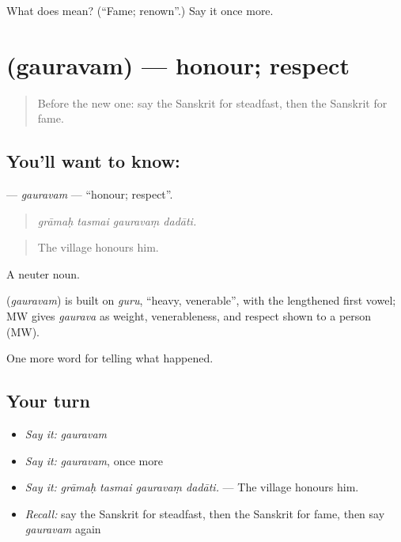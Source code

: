 \begin{tcolorbox}[breakable,colback=teal!4,colframe=teal!35!black,title={Before you move on}]
What does  mean? (\textquotedblleft{}Fame; renown\textquotedblright{}.) Say it once more.
\end{tcolorbox}
\section[\texorpdfstring{\sk{गौरवम्} (gauravam)}{गौरवम् (gauravam)}]{ (gauravam) — honour; respect}

\label{lesson:SA-C314-gauravam}



\begin{quote}
Before the new one: say the Sanskrit for steadfast, then the Sanskrit for fame.
\end{quote}

\subsection*{You'll want to know: }
\textbf{} — \emph{gauravam} — \textquotedblleft{}honour; respect\textquotedblright{}.

\begin{quote}
   
\end{quote}

\begin{quote}
\emph{grāmaḥ tasmai gauravaṃ dadāti.}
\end{quote}

\begin{quote}
The village honours him.
\end{quote}

A neuter noun.

\begin{cousinweb}
\textbf{} (\emph{gauravam}) is built on \emph{guru}, \textquotedblleft{}heavy, venerable\textquotedblright{}, with the lengthened first vowel; MW gives \emph{gaurava} as weight, venerableness, and respect shown to a person (MW).
\end{cousinweb}

\begin{grammarlens}[title={What you've built}]
One more word for telling what happened.
\end{grammarlens}

\subsection*{Your turn}
\begin{itemize}
\raggedright
  \item \emph{Say it:} \emph{gauravam}
  \item \emph{Say it:} \emph{gauravam}, once more
  \item \emph{Say it:} \emph{grāmaḥ tasmai gauravaṃ dadāti.} — The village honours him.
  \item \emph{Recall:} say the Sanskrit for steadfast, then the Sanskrit for fame, then say \emph{gauravam} again
\end{itemize}


